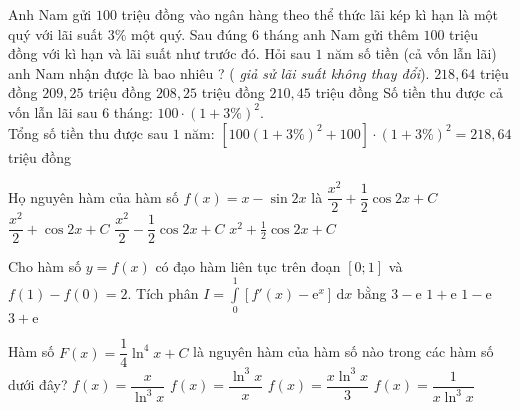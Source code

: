 \begin{ex}%
	Anh Nam gửi $100$ triệu đồng vào ngân hàng theo thể thức lãi kép kì hạn là một quý với lãi suất $3\%$ một quý. Sau đúng $6$ tháng anh Nam gửi thêm $100$ triệu đồng với kì hạn và lãi suất như trước đó. Hỏi sau $1$ năm số tiền (cả vốn lẫn lãi) anh Nam nhận được là bao nhiêu ? ( \textit{giả sử lãi suất không thay đổi}).
	\choice
	{\True $218,64$ triệu đồng}
	{$209,25$ triệu đồng}
	{$208,25$ triệu đồng}
	{$210,45$ triệu đồng}
	\loigiai
	{
		Số tiền thu được cả vốn lẫn lãi sau $6$ tháng: $100 \cdot(1+3 \%)^{2}$.\\
		Tổng số tiền thu được sau $1$ năm: $\left[100(1+3 \%)^{2}+100\right] \cdot(1+3 \%)^{2}=218,64$ triệu đồng
	}
\end{ex}

\begin{ex}%
	Họ nguyên hàm của hàm số $f(x)=x-\sin2x$ là
	\choice
	{\True $\dfrac{x^2}{2}+\dfrac{1}{2}\cos2x+C$}
	{$\dfrac{x^2}{2}+\cos2x+C$}
	{$\dfrac{x^2}{2}-\dfrac{1}{2}\cos2x+C$}
	{$x^2+\tfrac{1}{2}\cos 2x+C$}
\end{ex}


\begin{ex}%
	Cho hàm số $y=f(x)$ có đạo hàm liên tục trên đoạn $[0;1]$ và  $f(1)-f(0)=2$. Tích phân $I=\displaystyle\int\limits_{0}^{1} {\left[f'(x)-\mathrm{e}^x\right]}\mathrm{\,d}x$ bằng
	\choice
	{\True $3-\mathrm{e}$}
	{$1+\mathrm{e}$}
	{$1-\mathrm{e}$}
	{$3+\mathrm{e}$}
\end{ex}

\begin{ex}%
	Hàm số $F(x)=\dfrac{1}{4}\ln^4x+C$ là nguyên hàm của hàm số nào trong các hàm số dưới đây?
	\choice
	{$f(x)=\dfrac{x}{\ln^3x}$}
	{\True $f(x)=\dfrac{\ln^3x}{x}$}
	{$f(x)=\dfrac{x\ln^3x}{3}$}
	{$f(x)=\dfrac{1}{x\ln^3x}$}
\end{ex}

